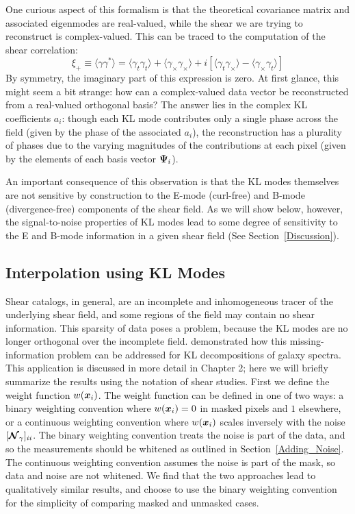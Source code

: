 One curious aspect of this formalism is that the theoretical covariance
matrix and associated eigenmodes are real-valued, while the shear we are
trying to reconstruct is complex-valued.  This can be traced
to the computation of the shear correlation:
\begin{equation}
  \xi_+ \equiv \langle\gamma \gamma^*\rangle
  = \langle \gamma_t\gamma_t\rangle + \langle \gamma_\times\gamma_\times\rangle
  + i[\langle\gamma_t\gamma_\times\rangle - \langle\gamma_\times\gamma_t\rangle]
\end{equation}
By symmetry, the imaginary part of this expression
is zero. At first glance, this might seem a bit strange:
how can a complex-valued data vector be reconstructed from a
real-valued orthogonal basis?  The answer lies in the complex KL coefficients
$a_i$: though each KL mode contributes only a single phase across the field
(given by the phase of the associated $a_i$), the reconstruction has a 
plurality of phases due to the varying magnitudes of the contributions 
at each pixel (given by the elements of each basis vector $\boldsymbol{\Psi}_i$).

An important consequence of this observation is that the KL modes 
themselves are not sensitive by construction to the E-mode (curl-free) 
and B-mode (divergence-free) components of the shear field. As we will
show below, however, the signal-to-noise properties of KL modes lead to 
some degree of sensitivity to the E and B-mode information in a given
shear field (See Section~\ref{Discussion}).


\subsection{Interpolation using KL Modes}
\label{KL_Interpolation}
Shear catalogs, in general, are an incomplete and inhomogeneous
tracer of the underlying shear field, and some regions of the field may 
contain no shear information.  This sparsity of data poses a problem,
because the KL modes are no longer orthogonal over the incomplete field.
\citet{Connolly99} demonstrated how this missing-information problem can be 
addressed for KL decompositions of galaxy spectra. 
This application is discussed in more detail in Chapter 2; here we will
briefly summarize the results using the notation of shear studies.
First we define the weight function $w(\boldsymbol{x}_i)$.
The weight function can be defined in one of two ways: 
a binary weighting convention where
$w(\boldsymbol{x}_i)=0$ in masked pixels and $1$ elsewhere, or a continuous 
weighting convention where $w(\boldsymbol{x}_i)$ scales inversely with the noise 
$[\boldsymbol{\mathcal{N}}_\gamma]_{ii}$.
The binary weighting convention treats the noise is part of the data, 
and so the measurements should be whitened as outlined in 
Section~\ref{Adding_Noise}.  
The continuous weighting convention assumes the noise is part of the mask, 
so data and noise are not whitened.
We find that the two approaches lead to qualitatively similar results, 
and choose to use the binary weighting convention for the simplicity of 
comparing masked and unmasked cases.

